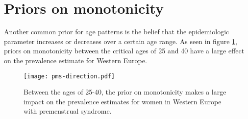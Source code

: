 \section{Priors on monotonicity}
Another common prior for age patterns is the belief that the epidemiologic parameter increases or decreases over a certain age range.  As seen in figure \ref{fig:app-knot_loc}, priors on monotonicity between the critical ages of 25 and 40 have a large effect on the prevalence estimate for Western Europe.

    \begin{figure}
        \begin{center}
            \texttt{[image: pms-direction.pdf]}
        \end{center}
        \caption{Between the ages of 25-40, the prior on monotonicity makes a large impact on the prevalence estimates for women in Western Europe with premenstrual syndrome.}
        \label{fig:app-knot_loc}
    \end{figure} 